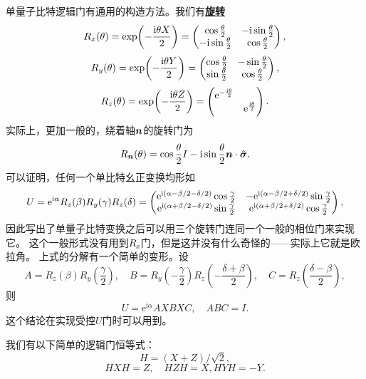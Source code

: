 \documentclass[hyperref, UTF8, a4paper]{ctexart}
\newcommand*{\ii}{\mathrm{i}}
\newcommand*{\ee}{\mathrm{e}}
\newcommand*{\concept}[1]{\underline{\textbf{#1}}}
\begin{document}
单量子比特逻辑门有通用的构造方法。我们有\concept{旋转}
\begin{equation}
    R_x(\theta) = \exp(-\frac{\ii \theta X}{2}) = \pmqty{ \cos \frac{\theta}{2} & - \ii \sin \frac{\theta}{2} \\ - \ii \sin \frac{\theta}{2} & \cos \frac{\theta}{2} },
\end{equation}
\begin{equation}
    R_y(\theta) = \exp(-\frac{\ii \theta Y}{2}) = \pmqty{ \cos \frac{\theta}{2} & - \sin \frac{\theta}{2} \\ \sin \frac{\theta}{2} & \cos \frac{\theta}{2} },
\end{equation}
\begin{equation}
    R_z(\theta) = \exp(-\frac{\ii \theta Z}{2}) = \pmqty{\dmat{\ee^{- \frac{\ii \theta}{2}}, \ee^{\frac{\ii \theta}{2}}}}.
\end{equation}
实际上，更加一般的，绕着轴$\vb*{n}$的旋转门为
\begin{equation}
    R_{\vb*{n}}(\theta) = \cos \frac{\theta}{2} I - \ii \sin \frac{\theta}{2} \vb*{n} \cdot \hat{\vb*{\sigma}}.
\end{equation}
可以证明，任何一个单比特幺正变换均形如
\begin{equation}
    U = \ee^{\ii \alpha} R_z(\beta) R_y(\gamma) R_z(\delta) = \pmqty{ \ee^{\ii (\alpha - \beta/2 - \delta / 2)} \cos \frac{\gamma}{2} & - \ee^{\ii (\alpha - \beta/2 + \delta / 2)} \sin \frac{\gamma}{2} \\ \ee^{\ii (\alpha + \beta/2 - \delta / 2)} \sin \frac{\gamma}{2} & \ee^{\ii (\alpha + \beta/2 + \delta / 2)} \cos \frac{\gamma}{2} },
\end{equation}
因此写出了单量子比特变换之后可以用三个旋转门连同一个一般的相位门来实现它。
这个一般形式没有用到$R_x$门，但是这并没有什么奇怪的——实际上它就是欧拉角。
上式的分解有一个简单的变形。设
\begin{equation}
    A = R_z(\beta) R_y \left( \frac{\gamma}{2} \right), \quad B = R_y\left( - \frac{\gamma}{2} \right) R_z\left( - \frac{\delta + \beta}{2} \right), \quad C = R_z\left( \frac{\delta - \beta}{2} \right),
\end{equation}
则
\begin{equation}
    U = \ee^{\ii \alpha} A X B X C, \quad ABC = I.
\end{equation}
这个结论在实现受控$U$门时可以用到。

我们有以下简单的逻辑门恒等式：
\begin{equation}
    H = (X + Z) / \sqrt{2},
\end{equation}
\begin{equation}
    H X H = Z, \quad H Z H = X, H Y H = - Y.
\end{equation}
\end{document}
